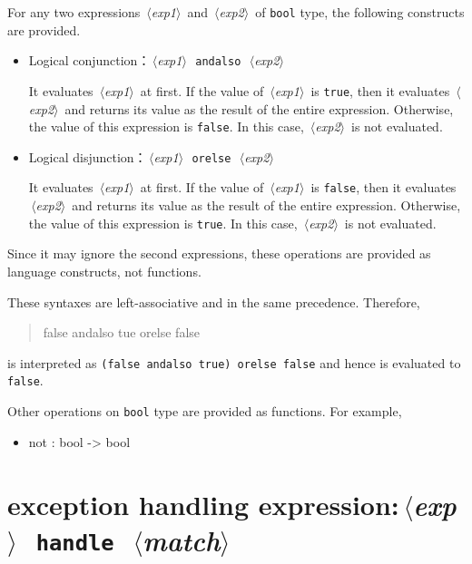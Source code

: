 \documentclass{jbook}
\newcommand{\txt}[2]{#2}
\newcommand{\code}[1]{\mbox{\large\tt #1}}
\newcommand{\nonterm}[1]{\mbox{$\,\langle$}{\it #1}\mbox{$\rangle\,$}}
\newcommand{\term}[1]{\mbox{{\tt #1}}}
\newenvironment{program}{\begin{quote}\begin{tt}}%
                        {\end{tt}\end{quote}}
\begin{document}
	For any two expressions \nonterm{exp1} and \nonterm{exp2} of 
\code{bool} type, the following constructs are provided.
\begin{itemize}
\item Logical conjunction：\nonterm{exp1}\ \term{andalso}\ \nonterm{exp2} 

	It evaluates \nonterm{exp1} at first.
	If the value of \nonterm{exp1} is \code{true}, then
it evaluates \nonterm{exp2} and returns its value as the result of
the entire expression.
	Otherwise, the value of this expression is \code{false}.
	In this case, \nonterm{exp2} is not evaluated.

\item Logical disjunction：\nonterm{exp1}\ \term{orelse}\ \nonterm{exp2}

	It evaluates \nonterm{exp1} at first.
	If the value of \nonterm{exp1} is \code{false}, then
it evaluates \nonterm{exp2} and returns its value as the result of
the entire expression.
	Otherwise, the value of this expression is \code{true}.
	In this case, \nonterm{exp2} is not evaluated.

\end{itemize}
	Since it may ignore the second expressions,
these operations are provided as language constructs, not functions.

	These syntaxes are left-associative and in the same
precedence.
	Therefore,
\begin{program}
false andalso tue orelse false
\end{program}
is interpreted as \code{(false andalso true) orelse false}
and hence is evaluated to \code{false}.

	Other operations on \code{bool} type are provided as
functions.
	For example,
\begin{itemize}
\item not : bool -> bool
\end{itemize}
\fi%


\section{\txt{例外処理式}{exception handling expression}:\nonterm{exp}\ \term{handle}\ \nonterm{match}}
\label{sec:expression:handle}
\end{document}
